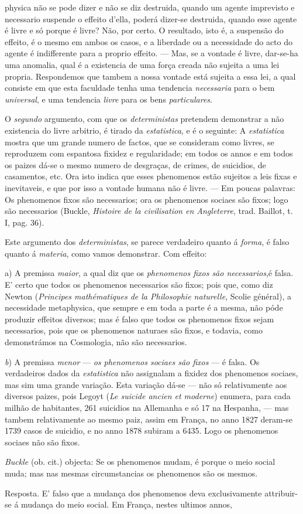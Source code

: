 physica não se pode dizer e não se diz destruida, quando um agente imprevisto e necessario suspende o effeito d'ella, poderá dizer-se destruida, quando esse agente é livre e só porque é livre? Não, por certo. O resultado, isto é, a suspensão do effeito, é o mesmo em ambos os casos, e a liberdade ou a necessidade do acto do agente é indifferente para a proprio effeito. --- Mas, se a vontade é livre, dar-se-ha uma anomalia, qual é a existencia de uma força creada não sujeita a uma lei propria. Respondemos que tambem a nossa vontade está sujeita a essa lei, a qual consiste em que esta faculdade tenha uma tendencia \emph{necessaria} para o bem \emph{universal}, e uma tendencia \emph{livre} para os bens \emph{particulares}.\par O \emph{segundo} argumento, com que os \emph{deterministas} pretendem demonstrar a não existencia do livre arbitrio, é tirado da \emph{estatistica}, e é o seguinte: A \emph{estatistica} mostra que um grande numero de factos, que se consideram como livres, se reproduzem com espantosa fixidez e regularidade; em todos os annos e em todos os paizes dá-se o mesmo numero de desgraças, de crimes, de suicidios, de casamentos, etc. Ora isto indica que esses phenomenos estão sujeitos a leis fixas e inevitaveis, e que por isso a vontade humana não é livre. --- Em poucas palavras: Os phenomenos fixos são necessarios; ora os phenomenos sociaes são fixos; logo são necessarios (Buckle, \emph{Histoire de la civilisation en Angleterre}, trad. Baillot, t. I, pag. 36).\par Este argumento dos \emph{deterministas}, se parece verdadeiro quanto á \emph{forma}, é falso quanto á \emph{materia}, como vamos demonstrar. Com effeito:\par a) A premissa \emph{maior}, a qual diz que os \emph{phenomenos fixos são necessarios},é falsa. E' certo que todos os phenomenos necessarios são fixos; pois que, como diz Newton (\emph{Principes mathématiques de la Philosophie naturelle}, Scolie général), a necessidade metaphysica, que sempre e em toda a parte é a mesma, não póde produzir effeitos diversos; mas é falso que todos os phenomenos fixos sejam necessarios, pois que os phenomenos naturaes são fixos, e todavia, como demonstrámos na Cosmologia, não são necessarios.\par \emph{b}) A premissa \emph{menor} --- \emph{os phenomenos sociaes são fixos} --- é falsa. Os verdadeiros dados da \emph{estatistica} não assignalam a fixidez dos phenomenos sociaes, mas sim uma grande variação. Esta variação dá-se --- não só relativamente aos diversos paizes, pois Legoyt (\emph{Le suicide ancien et moderne}) enumera, para cada milhão de habitantes, 261 suicidios na Allemanha e só 17 na Hespanha, --- mas tambem relativamente ao mesmo paiz, assim em França, no anno 1827 deram-se 1739 casos de suicidio, e no anno 1878 subiram a 6435. Logo os phenomenos sociaes não são fixos.\par \emph{Buckle} (ob. cit.) objecta: Se os phenomenos mudam, é porque o meio social muda; mas nas mesmas circumstancias os phenomenos são os mesmos.\par Resposta. E' falso que a mudança dos phenomenos deva exclusivamente attribuir-se á mudança do meio social. Em França, nestes ultimos annos, 